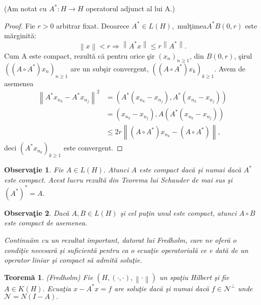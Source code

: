 \documentclass[a4paper,12pt,oneside]{report}
\newtheorem{theorem}{Teorem\u a}
\newtheorem{remark}{Observa\c{t}ie}
\begin{document}
 (Am notat cu $A^{\ast}:H\rightarrow H$ operatorul adjunct al lui A.)
\begin{proof}
 Fie $r > 0$ arbitrar fixat. Deoarece  $A^{\ast } \in L(H),$ mul\c{t}imea\(A^{\ast}B\left ( 0,r \right )\) este m\u{a}rginit\u{a}:
 \[\left \| x \right \| < r \Rightarrow \left \| A^{\ast }x \right \|\leq r\left \| A^{\ast } \right \|.\]
 Cum A este compact, rezult\u{a} c\u{a} pentru orice \c{s}ir \(\left ( x_{n} \right )_{n\geq 1}\), din \(B\left ( 0,r \right )\), \c{s}irul \(\left ( \left ( A\circ A^{\ast } \right ) x_{n}\right )_{n\geq 1}\) are un sub\c{s}ir convergent, \(\left ( \left ( A\circ A^{\ast } \right ) x_{k}\right )_{k\geq 1}.\) Avem de asemenea
\begin{equation} \nonumber
    \begin{split}
     \left \| A^{\ast } x_{n_{k}} - A^{\ast }x_{n_{j}}\right \|^{2}  & = \left ( A^{\ast }\left ( x_{n_{k}} - x_{n_{j}} \right ),A^{\ast }\left ( x_{n_{k}} - x_{n_{j}} \right )  \right )  \\ & = \left ( x_{n_{k}} - x_{n_{j}} \right ), A \left ( A^{\ast }\left ( x_{n_{k}} - x_{n_{j}} \right ) \right ) \\ & \leq 2r\left \| \left (A\circ A^{\ast }  \right ) x_{n_{k}} - \left ( A \circ A^{\ast } \right ) \right \|,
    \end{split}
\end{equation}
deci \(\left ( A^{\ast } x_{n_{k}}\right )_{k\geq 1}\) este convergent.
\end{proof}
\begin{remark}
Fie \(A \in L\left ( H \right ).\)  Atunci \(A\) este compact dac\u{a} \c{s}i numai dac\u{a} \(A^{\ast }\) este compact. Acest lucru rezult\u{a} din Teorema lui Schauder de mai sus \c{s}i \(\left ( A^{\ast } \right )^{\ast } = A. \)
\end{remark}
\begin{remark}
Dac\u{a} \(A, B \in L\left ( H \right )\) \c{s}i cel pu\c{t}in unul este compact, atunci \(A \circ B\) este compact de asemenea.

\noindent Continu\u{a}m cu un rezultat important, datorat lui Fredholm, care ne ofer\u{a} o condi\c{t}ie necesar\u{a} \c{s}i suficient\u{a} pentru ca o ecua\c{t}ie operatorial\u{a} ce e dat\u{a} de un operator liniar \c{s}i compact s\u{a} admit\u{a} solu\c{t}ie.
\end{remark}
\begin{theorem}
(Fredholm) Fie \(\left ( H, \left ( \cdot ,\cdot  \right ), \left \| \cdot  \right \| \right )\) un spa\c{t}iu Hilbert \c{s}i fie \(A \in K\left ( H \right ).\) Ecua\c{t}ia \(x - A^{\ast }x = f\) are solu\c{t}ie dac\u{a} \c{s}i numai dac\u{a} \(f \in { \mathcal{N}} ^{\perp }\) unde \({ \mathcal{N}} = N\left ( I - A \right ). \)
\end{theorem}
\end{document}

